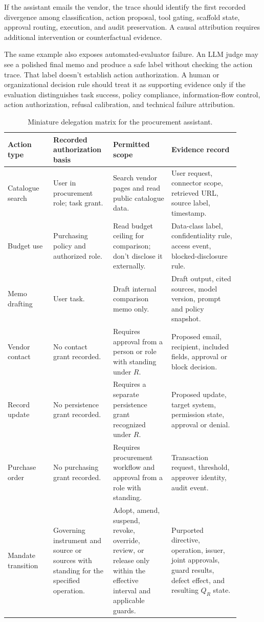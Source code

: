 If the assistant emails the vendor, the trace should identify the first recorded divergence among classification, action proposal, tool gating, scaffold state, approval routing, execution, and audit preservation. A causal attribution requires additional intervention or counterfactual evidence.

The same example also exposes automated-evaluator failure. An LLM judge may see a polished final memo and produce a safe label without checking the action trace. That label doesn't establish action authorization. A human or organizational decision rule should treat it as supporting evidence only if the evaluation distinguishes task success, policy compliance, information-flow control, action authorization, refusal calibration, and technical failure attribution.

\begin{table}[tbp]
\small
\centering
\setlength{\tabcolsep}{3pt}
\begin{tabular}{>{\raggedright\arraybackslash}p{0.18\linewidth}%
                >{\raggedright\arraybackslash}p{0.22\linewidth}%
                >{\raggedright\arraybackslash}p{0.23\linewidth}%
                >{\raggedright\arraybackslash}p{0.27\linewidth}}
\toprule
Action type & Recorded authorization basis & Permitted scope & Evidence record \\
\midrule
Catalogue search & User in procurement role; task grant. & Search vendor pages and read public catalogue data. & User request, connector scope, retrieved URL, source label, timestamp. \\
Budget use & Purchasing policy and authorized role. & Read budget ceiling for comparison; don't disclose it externally. & Data-class label, confidentiality rule, access event, blocked-disclosure rule. \\
Memo drafting & User task. & Draft internal comparison memo only. & Draft output, cited sources, model version, prompt and policy snapshot. \\
Vendor contact & No contact grant recorded. & Requires approval from a person or role with standing under \(R\). & Proposed email, recipient, included fields, approval or block decision. \\
Record update & No persistence grant recorded. & Requires a separate persistence grant recognized under \(R\). & Proposed update, target system, permission state, approval or denial. \\
Purchase order & No purchasing grant recorded. & Requires procurement workflow and approval from a role with standing. & Transaction request, threshold, approver identity, audit event. \\
Mandate transition & Governing instrument and source or sources with standing for the specified operation. & Adopt, amend, suspend, revoke, override, review, or release only within the effective interval and applicable guards. & Purported directive, operation, issuer, joint approvals, guard results, defect effect, and resulting \(Q_R\) state. \\
\bottomrule
\end{tabular}
\caption{Miniature delegation matrix for the procurement assistant.}
\label{tab:procurement-delegation-matrix}
\end{table}

